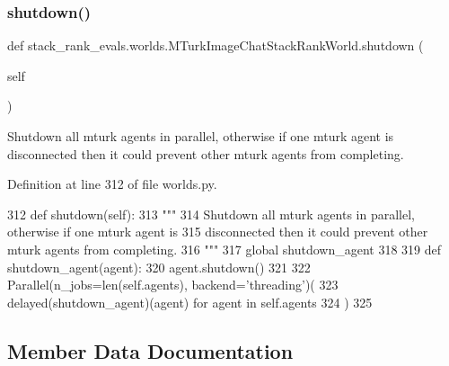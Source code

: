 \mbox{\label{classstack__rank__evals_1_1worlds_1_1MTurkImageChatStackRankWorld_ab273e639ff15f9c20a49d478abb4aa31}} 
\subsubsection{\texorpdfstring{shutdown()}{shutdown()}}
{\footnotesize\ttfamily def stack\+\_\+rank\+\_\+evals.\+worlds.\+M\+Turk\+Image\+Chat\+Stack\+Rank\+World.\+shutdown (\begin{DoxyParamCaption}\item[{}]{self }\end{DoxyParamCaption})}

\begin{DoxyVerb}Shutdown all mturk agents in parallel, otherwise if one mturk agent is
disconnected then it could prevent other mturk agents from completing.
\end{DoxyVerb}
 

Definition at line 312 of file worlds.\+py.


\begin{DoxyCode}
312     \textcolor{keyword}{def }shutdown(self):
313         \textcolor{stringliteral}{"""}
314 \textcolor{stringliteral}{        Shutdown all mturk agents in parallel, otherwise if one mturk agent is}
315 \textcolor{stringliteral}{        disconnected then it could prevent other mturk agents from completing.}
316 \textcolor{stringliteral}{        """}
317         \textcolor{keyword}{global} shutdown\_agent
318 
319         \textcolor{keyword}{def }shutdown\_agent(agent):
320             agent.shutdown()
321 
322         Parallel(n\_jobs=len(self.agents), backend=\textcolor{stringliteral}{'threading'})(
323             delayed(shutdown\_agent)(agent) \textcolor{keywordflow}{for} agent \textcolor{keywordflow}{in} self.agents
324         )
325 \end{DoxyCode}


\subsection{Member Data Documentation}
\mbox{\label{classstack__rank__evals_1_1worlds_1_1MTurkImageChatStackRankWorld_a197cd340a59af888ff5028375159c797}} 
